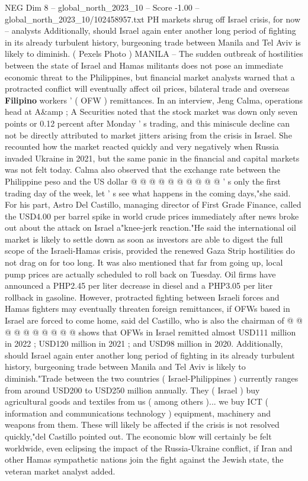 \begin{textsample}{NEG Dim 8 – global\_north\_2023\_10 – Score -1.00 – global\_north\_2023\_10/102458957.txt}  \label{ex:f8_neg_241}
PH markets shrug off Israel crisis, for now -- analysts Additionally, should Israel again enter another long period of fighting in its already turbulent history, burgeoning trade between Manila and Tel Aviv is likely to diminish. ( Pexels Photo ) MANILA -- The sudden outbreak of hostilities between the state of Israel and Hamas militants does not pose an immediate economic threat to the Philippines, but financial market analysts warned that a protracted conflict will eventually affect oil prices, bilateral trade and overseas \textbf{Filipino} workers ' ( OFW ) remittances.
In an interview, Jeng Calma, operations head at A\&amp ; A Securities noted that the stock market was down only seven points or 0.12 percent after Monday ' s trading, and this miniscule decline can not be directly attributed to market jitters arising from the crisis in Israel.
She recounted how the market reacted quickly and very negatively when Russia invaded Ukraine in 2021, but the same panic in the financial and capital markets was not felt today.
Calma also observed that the exchange rate between the Philippine peso and the US dollar @ @ @ @ @ @ @ @ @ @ ' s only the first trading day of the week, let ' s see what happens in the coming days,"she said.
For his part, Astro Del Castillo, managing director of First Grade Finance, called the USD4.00 per barrel spike in world crude prices immediately after news broke out about the attack on Israel a"knee-jerk reaction."He said the international oil market is likely to settle down as soon as investors are able to digest the full scope of the Israeli-Hamas crisis, provided the renewed Gaza Strip hostilities do not drag on for too long.
It was also mentioned that far from going up, local pump prices are actually scheduled to roll back on Tuesday.
Oil firms have announced a PHP2.45 per liter decrease in diesel and a PHP3.05 per liter rollback in gasoline.
However, protracted fighting between Israeli forces and Hamas fighters may eventually threaten foreign remittances, if OFWs based in Israel are forced to come home, said del Castillo, who is also the chairman of @ @ @ @ @ @ @ @ @ @ shows that OFWs in Israel remitted almost USD111 million in 2022 ; USD120 million in 2021 ; and USD98 million in 2020.
Additionally, should Israel again enter another long period of fighting in its already turbulent history, burgeoning trade between Manila and Tel Aviv is likely to diminish."Trade between the two countries ( Israel-Philippines ) currently ranges from around USD200 to USD250 million annually.
They ( Israel ) buy agricultural goods and textiles from us ( among others )... we buy ICT ( information and communications technology ) equipment, machinery and weapons from them.
These will likely be affected if the crisis is not resolved quickly,"del Castillo pointed out.
The economic blow will certainly be felt worldwide, even eclipsing the impact of the Russia-Ukraine conflict, if Iran and other Hamas sympathetic nations join the fight against the Jewish state, the veteran market analyst added.

\end{textsample}
